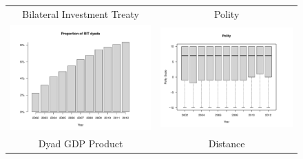 \documentclass[reqno,onecolumn,letterpaper,12pt]{article}
\begin{document}
\begin{figure}[htp]
\centering
\begin{tabular}{c@{\hskip -.4cm}c}
Bilateral Investment Treaty &
Polity\\
\includegraphics[height=.2\textheight, clip=true, trim=0cm 1cm 0cm 1.6cm]{draft_figures/descriptive_plots/BIT.pdf}    &
\includegraphics[height=.2\textheight, clip=true, trim =1cm 1cm 0cm 1.6cm]{draft_figures/descriptive_plots/Polity.pdf}   \\
Dyad GDP Product &
Distance\\

\end{tabular}
\end{figure}
\end{document}
